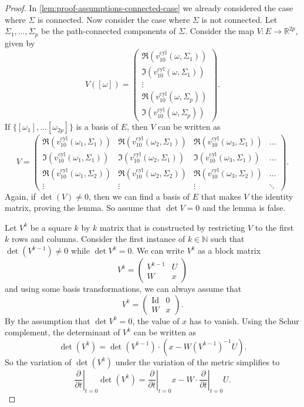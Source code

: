 \documentclass[preprint,12pt]{elsarticle}
\numberwithin{table}{section}
\newcommand{\R}{\mathbb{R}}
\newcommand{\N}{\mathbb{N}}
\newcommand{\del}{\partial}
\begin{document}
\begin{proof}
	In \cref{lem:proof-assumptions-connected-case} we already considered the case where $\Sigma$ is connected. Now consider the case where $\Sigma$ is not connected. Let $\Sigma_1, \ldots, \Sigma_p$ be the path-connected components of $\Sigma$.
	Consider the map $V \colon E \to \R^{2p}$, given by
	$$
	V([\omega]) = \begin{pmatrix}
		\Re(v^{\mathrm{cyl}}_{10}(\omega, \Sigma_1))\\ \Im(v^{\mathrm{cyl}}_{10}(\omega, \Sigma_1)) \\
		\vdots \\
		\Re(v^{\mathrm{cyl}}_{10}(\omega, \Sigma_p))\\ \Im(v^{\mathrm{cyl}}_{10}(\omega, \Sigma_p)) 
	\end{pmatrix}.$$
	If $\{[\omega_1], \ldots [\omega_{2p}]\}$ is a basis of $E$, then $V$ can be written as
	\begin{equation}
		\label{eq:variation:matrix-V}
		V = \begin{pmatrix}
			\Re(v^{\mathrm{cyl}}_{10}(\omega_1, \Sigma_1)) 
			& \Re(v^{\mathrm{cyl}}_{10}(\omega_2, \Sigma_1)) 
			& \Re(v^{\mathrm{cyl}}_{10}(\omega_3, \Sigma_1)) 
			& \ldots \\
			\Im(v^{\mathrm{cyl}}_{10}(\omega_1, \Sigma_1)) 
			& \Im(v^{\mathrm{cyl}}_{10}(\omega_2, \Sigma_1))
			& \Im(v^{\mathrm{cyl}}_{10}(\omega_3, \Sigma_1))
			& \ldots \\
			\Re(v^{\mathrm{cyl}}_{10}(\omega_1, \Sigma_2)) 
			& \Re(v^{\mathrm{cyl}}_{10}(\omega_2, \Sigma_2)) 
			& \Re(v^{\mathrm{cyl}}_{10}(\omega_3, \Sigma_2)) 
			& \ldots \\
			\vdots & \vdots & \vdots & \ddots
		\end{pmatrix}.
	\end{equation}
	Again, if $\det (V) \not = 0$, then we can find a basis of $E$ that makes $V$ the identity matrix, proving the lemma. So assume that $\det V = 0$ and the lemma is false.
	
	Let $V^k$ be a square $k$ by $k$ matrix that is constructed by restricting $V$ to the first $k$ rows and columns. Consider the first instance of $k \in \N$ such that $\det(V^{k-1}) \not = 0$ while $\det V^k = 0$.
	We can write $V^k$ as a block matrix
	$$
	V^k = \begin{pmatrix}
		V^{k-1} & U \\
		W & x
	\end{pmatrix}
	$$ 
	and using some basis transformations, we can always assume that 
	$$
	V^k = \begin{pmatrix}
		\operatorname{Id} & 0 \\
		W & x
	\end{pmatrix}.
	$$ 
	By the assumption that $\det V^k = 0$, the value of $x$ has to vanish. Using the Schur complement, the determinant of $V^k$ can be written as
	$$
	\det(V^k) = \det(V^{k-1}) \cdot (x - W (V^{k-1})^{-1} U).
	$$
	So the variation of $\det(V^k)$ under the variation of the metric simplifies to
	$$
	\left.\frac{\del }{\del t}\right|_{t=0} \det(V^k) = \left.\frac{\del}{\del t}\right|_{t=0} x - W\cdot \left.\frac{\del }{\del t}\right|_{t=0} U.
	$$


\end{proof}
\end{document}
